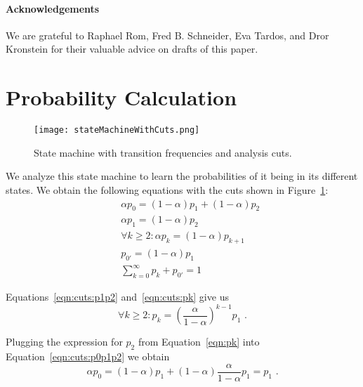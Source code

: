 \documentclass[letterpaper]{llncs}
\begin{document}
\paragraph{Acknowledgements} 
We are grateful to Raphael Rom, Fred B. Schneider, Eva Tardos, and Dror Kronstein for their valuable advice on drafts of this paper.



\clearpage

 
 



\clearpage

\appendix

    \section{Probability Calculation} \label{app:probs} 

\begin{figure}[!b] 
\centering
\texttt{[image: stateMachineWithCuts.png]}
\caption{ 
State machine with transition frequencies and analysis cuts. 
} 
\label{fig:stateMachineWithCuts} 
\end{figure}

We analyze this state machine to learn the probabilities of it being in its different states. We obtain the following equations with the cuts shown in Figure~\ref{fig:stateMachineWithCuts}: 
\begin{eqnarray} 
&&\alpha p_0 = (1-\alpha) p_1 + (1-\alpha) p_2 \label{eqn:cuts:p0p1p2} \\
&&\alpha p_1 = (1-\alpha) p_2 \label{eqn:cuts:p1p2} \\
&&\forall k \ge 2: \alpha p_k = (1-\alpha) p_{k+1} \label{eqn:cuts:pk} \\
&&p_{0'} = (1 - \alpha) p_1 \label{eqn:cuts:p00p1} \\
&&\sum_{k=0}^\infty p_k + p_{0'} = 1 \label{eqn:cuts:sumP}
\end{eqnarray} 

Equations~\ref{eqn:cuts:p1p2} and~\ref{eqn:cuts:pk} give us 
\begin{equation} 
\forall k \ge 2: p_k = \left( \frac{\alpha}{1-\alpha} \right)^{k-1} p_1 \label{eqn:pk} \,\, .
\end{equation} 

Plugging the expression for $p_2$ from Equation~\ref{eqn:pk} into Equation~\ref{eqn:cuts:p0p1p2} we obtain 
\begin{equation} 
\alpha p_0 = (1-\alpha) p_1 + (1-\alpha) \frac{\alpha}{1-\alpha} p_1 = p_1 \label{eqn:p0p1} \,\, .
\end{equation} 
\end{document}
